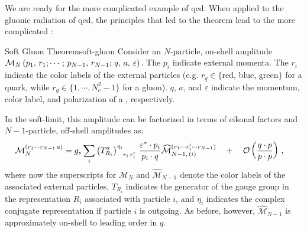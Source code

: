 We are ready for the more complicated example of \gls{qcd}.
%
When applied to the gluonic radiation of \gls{qcd}, the principles that led to the  theorem lead to the more complicated :
\begin{theorembox}{Soft Gluon Theorem}{soft-gluon}
    Consider an \(N\)-particle, on-shell amplitude \(\mathcal{M}_N\left(p_1,\,r_1; \cdots;\,p_{N-1},\,r_{N-1};\,q,\,a,\,\varepsilon\right)\).
    The \(p_i\) indicate external momenta.
    The \(r_i\) indicate the color labels of the external particles (e.g. \(r_q \in \{\)red, blue, green\(\}\) for a quark, while \(r_g \in \{1,\cdots,N_c^2-1\}\) for a gluon).
    \(q\), \(a\), and \(\varepsilon\) indicate the momentum, color label, and polarization of a , respectively.

    In the \gls{soft-limit}, this amplitude can be factorized in terms of eikonal factors and \(N-1\)-particle, off-shell amplitudes as:
    \begin{equation}
    \begin{aligned}
        \mathcal{M}^{(r_1\cdots r_{N-1}\,a)}_N
        &=
        g_s
        \sum_{i}
        \le(T^a_{R_i}\ri)\indices{^{\eta_i}_{r_i\,r'_i}}
        \,
        \frac{\varepsilon^* \cdot p_i}{p_i \cdot q}
        \widehat{\mathcal{M}}
        ^{(r_1\cdots r'_i\cdots r_{N-1})}
        _{N-1,\,(i)}
        \quad
        +
        \quad
        \mathcal{O}\le(\frac{q\cdot p}{p \cdot p}\ri)
        \,,
    \end{aligned}
    \end{equation}
    where now the superscripts for \(\mathcal{M}_N\) and \(\widehat{\mathcal{M}}_{N-1}\) denote the color labels of the associated external particles, \(T_{R_i}\) indicates the generator of the gauge group in the representation \(R_i\) associated with particle \(i\), and \(\eta_i\) indicates the complex conjugate representation if particle \(i\) is outgoing.
    As before, however, \(\widehat{\mathcal{M}}_{N-1}\) is approximately on-shell to leading order in \(q\).
\end{theorembox}


